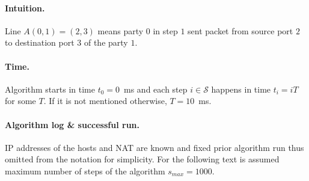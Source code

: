 \documentclass{llncs}
\begin{document}
\paragraph{Intuition.} 
Line $A(0,1) = (2,3)$ means party $0$ in step $1$ sent packet from source port $2$ to destination port $3$
of the party $1$.

\paragraph{Time.} 
Algorithm starts in time $t_0 = 0$~ms and each step $i \in \mathcal{S}$
happens in time $t_i = iT$ for some $T$. If it is not mentioned otherwise, $T = 10$~ms.


\paragraph{Algorithm log \& successful run.} IP addresses of the hosts and NAT are known and fixed prior algorithm run thus omitted
from the notation for simplicity. For the following text is assumed maximum number of steps of the algorithm $s_{max}=1000$.
\end{document}
